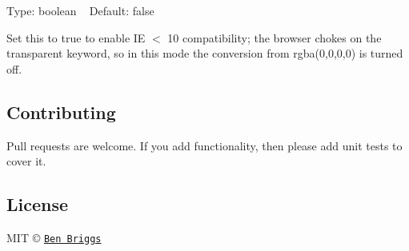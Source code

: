 Type\+: {\ttfamily boolean} ~\newline
Default\+: {\ttfamily false}

Set this to {\ttfamily true} to enable IE $<$ 10 compatibility; the browser chokes on the {\ttfamily transparent} keyword, so in this mode the conversion from {\ttfamily rgba(0,0,0,0)} is turned off.

\subsection*{Contributing}

Pull requests are welcome. If you add functionality, then please add unit tests to cover it.

\subsection*{License}

M\+IT © \href{http://beneb.info}{\tt Ben Briggs} 